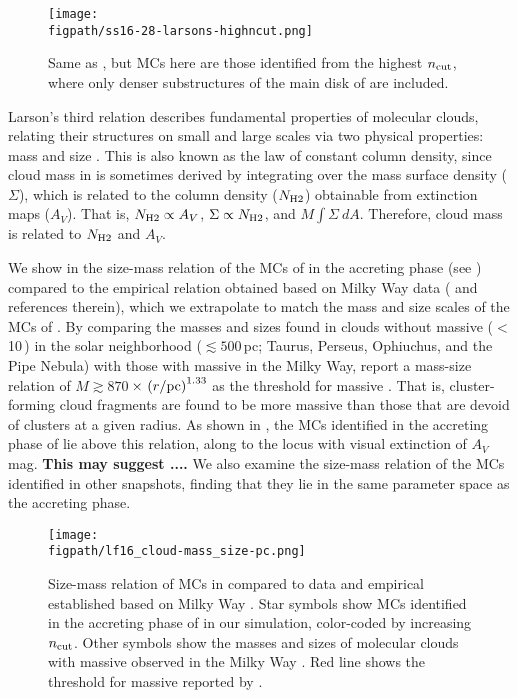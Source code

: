 \documentclass[iop]{emulateapj} %
\begin{document}
\begin{figure*}[htbp]
\centering
\texttt{[image: \\figpath/ss16-28-larsons-highncut.png]}
\caption{
Same as , but MCs here are those identified from the highest $n_{\rm cut}$,
where only denser substructures of the main disk of \flower are included.
\label{fig:larsons16-28-highncut}}
\end{figure*}

Larson's third relation describes fundamental properties of molecular clouds, relating their structures on small and large scales 
via two physical properties: mass and size \citep{Larson81a, Mckee07a}. This is also known as the law of constant column density, 
since cloud mass in \obs is sometimes derived by integrating
over the mass surface density ($\Sigma$), which is related to the column density ($N_{\rm H2}$) obtainable from extinction maps ($A_V$).   
That is, $N_{\rm H2}\propto A_V$, $\Sigma\propto N_{\rm H2}$, and $M$\eq$\int \Sigma~dA$.
Therefore, cloud mass is related to $N_{\rm H2}$ and $A_V$.

We show in  the size-mass relation of the MCs of \flower in the accreting phase (see )
compared to the empirical relation obtained based on 
Milky Way data (\citealt{Kauffmann10b, Kauffmann10c} and references therein),
which we extrapolate to match the mass and size scales of the MCs of \flower.
By comparing the masses and sizes found in clouds without massive \SF ($<$10\,\Msun) 
in the solar neighborhood ($\lesssim 500$\,pc; Taurus, Perseus, Ophiuchus, and the 
Pipe Nebula) with those with massive \SF in the Milky Way, \citet{Kauffmann10c} report a 
mass-size relation of $M \gtrsim 870$\,\Msun$\times\,\left(r/{\rm pc}\right)^{1.33}$ as the threshold for massive \SF. 
That is, cluster-forming cloud fragments are found to be more massive than those that are devoid of clusters 
at a given radius. As shown in , the MCs identified in the accreting phase of \flower lie above this relation, along to the locus 
with visual extinction of $A_V$\,mag. {\bf This may suggest ....}
We also examine the size-mass relation of the MCs identified in other snapshots, finding that they lie in the same 
parameter space as the accreting phase.

\begin{figure*}[htbp]
\centering
\texttt{[image: \\figpath/lf16\_cloud-mass\_size-pc.png]}
\caption{
Size-mass relation of MCs in \flower compared to data and empirical established based on Milky Way \obs.
Star symbols show MCs identified in the accreting phase of \flower in our simulation, color-coded by increasing $n_{\rm cut}$.
Other symbols show the masses and sizes of molecular clouds with massive \SF observed in the 
Milky Way \citep{Beuther02a, Mueller02a, Hill05a, Motte07a}.
Red line shows the threshold for massive \SF reported by \citet{Kauffmann10b}.
\label{fig:MR}}
\end{figure*}
\end{document}
